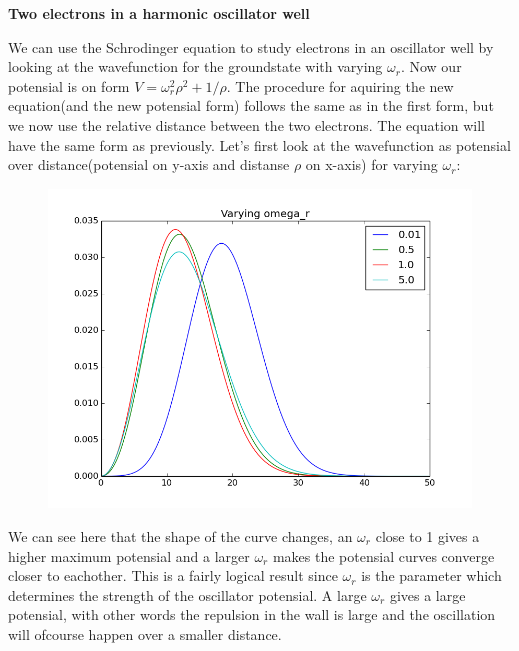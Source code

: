 \documentclass[11pt, a4 paper]{report}
\newenvironment{tabbed}{\begin{addmargin}{0.1cm}}{\end{addmargin}}
\newcommand{\sectiontitle}[1]{\begin{center} \Large\textbf{{#1}} \end{center}}
\begin{document}
\sectiontitle{Two electrons in a harmonic oscillator well}
    \begin{tabbed}
        We can use the Schrodinger equation to study electrons in an oscillator well by looking at the wavefunction for the groundstate with varying $\omega_r$. Now our potensial is on form $V=\omega_r^2\rho^2+1/\rho$. The procedure for aquiring the new equation(and the new potensial form) follows the same as in the first form, but we now use the relative distance between the two electrons. The equation will have the same form as previously. Let's first look at the wavefunction as potensial over distance(potensial on y-axis and distanse $\rho$ on x-axis) for varying $\omega_r$:
        \begin{figure}[H]
            \centering
            \includegraphics[scale=0.4]{vary.png}
        \end{figure}
    \end{tabbed}
        We can see here that the shape of the curve changes, an $\omega_r$ close to 1 gives a higher maximum potensial and a larger $\omega_r$ makes the potensial curves converge closer to eachother. This is a fairly logical result since $\omega_r$ is the parameter which determines the strength of the oscillator potensial. A large $\omega_r$ gives a large potensial, with other words the repulsion in the wall is large and the oscillation will ofcourse happen over a smaller distance.
\end{document}
